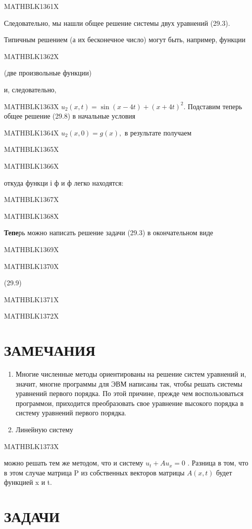 \documentclass[
]{article}
\begin{document}
{{{MATHBLK1361X

Следовательно, мы нашли общее решение системы двух уравнений (29.3).

Типичным решением (а их бесконечное число) могут быть, например, функции

MATHBLK1362X

(две произвольные функции)

и, следовательно,

MATHBLK1363X \(u_2(x, t) = \sin(x-4t) + (x+4t)^2.\) Подставим теперь
общее решение (29.8) в начальные условия

MATHBLK1364X \(u_2(x, 0) = g(x),\) в результате получаем

MATHBLK1365X

MATHBLK1366X

откуда функци і ф и ф легко находятся:

MATHBLK1367X

MATHBLK1368X

\textbf{Тепе}рь можно написать решение задачи (29.3) в окончательном
виде

MATHBLK1369X

MATHBLK1370X

(29.9)

MATHBLK1371X

MATHBLK1372X

\section{ЗАМЕЧАНИЯ}\label{ux437ux430ux43cux435ux447ux430ux43dux438ux44f-10}

\begin{enumerate}
\def\labelenumi{\arabic{enumi}.}
\item
  Многие численные методы ориентированы на решение систем уравнений и,
  значит, многне программы для ЭВМ написаны так, чтобы решать системы
  уравнений первого порядка. По этой причине, прежде чем воспользоваться
  программои, приходится преобразовать свое уравнение высокого порядка в
  систему уравнений первого порядка.
\item
  Линейную систему
\end{enumerate}

MATHBLK1373X

можно решать тем же методом, что и систему \(u_t + Au_x = 0\) . Разница
в том, что в этом случае матрица P из собственных векторов матрицы
\(A(x, t)\) будет функцией x и t.

\section{ЗАДАЧИ}\label{ux437ux430ux434ux430ux447ux438-10}

}}}
\end{document}

